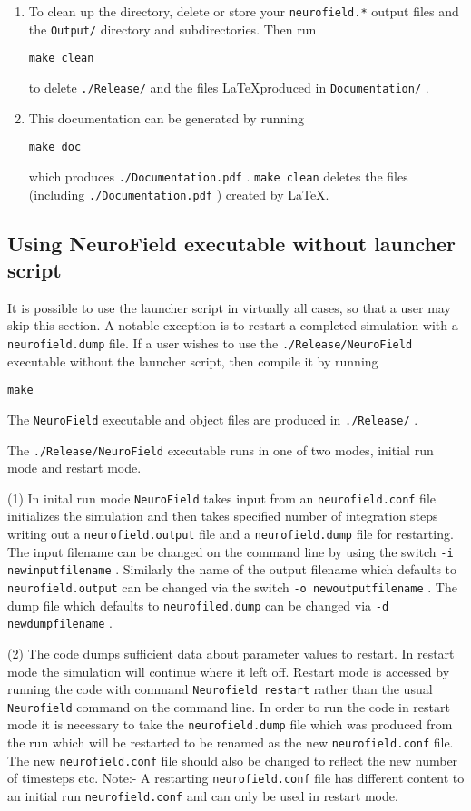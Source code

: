 \documentclass[12pt,a4paper]{article}
\newcommand{\type}[1]{ {\small\small\tt #1} }
\begin{document}
\begin{enumerate}
\item To clean up the directory, delete or store your \type{neurofield.*} output files and the \type{Output/} directory and subdirectories. Then run
\begin{lstlisting}
make clean
\end{lstlisting}
to delete \type{./Release/} and the files \LaTeX produced in \type{Documentation/}.

\item This documentation can be generated by running 
\begin{lstlisting}
make doc
\end{lstlisting}
which produces \type{./Document\-ation.pdf}. \type{make clean} deletes the files (including \type{./Document\-ation.pdf}) created by \LaTeX.

\end{enumerate}

\subsection{Using NeuroField executable without launcher script}
\label{sec:exe}

It is possible to use the launcher script in virtually all cases, so that a user may skip this section. A notable exception is to restart a completed simulation with a \type{neurofield.dump} file. If a user wishes to use the \type{./Release/NeuroField} executable without the launcher script, then compile it by running
\begin{lstlisting}
make
\end{lstlisting}
The \type{NeuroField} executable and object files are produced in \type{./Release/}.

The \type{./Release/NeuroField} executable runs in one of two modes, initial run mode and restart mode.

(1) In inital run mode \type{NeuroField} takes input from an \type{neurofield.conf} file initializes the simulation and then takes specified number of integration steps writing out a \type{neurofield.output} file and a \type{neurofield.dump} file for restarting.  The input filename can be changed on the command line by using the switch \type{-i newinputfilename}. Similarly the name of the output filename which defaults to \type{neurofield.output} can be changed via the switch \type{-o newoutputfilename}. The dump file which defaults to \type{neurofiled.dump} can be changed via \type{-d newdumpfilename}.

(2) The code dumps sufficient data about parameter values to restart. In restart mode the simulation will continue where it left off. Restart mode is accessed by running the code with command \type{Neurofield restart} rather than the usual \type{Neurofield} command on the command line. In order to run the code in restart mode it is necessary to take the \type{neurofield.dump} file which was produced from the run which will be restarted to be renamed as the new \type{neurofield.conf} file. The new \type{neurofield.conf} file should also be changed to reflect the new number of timesteps etc.  Note:- A restarting \type{neurofield.conf} file has different content to an initial run \type{neurofield.conf} and can only be used in restart mode.
\end{document}
